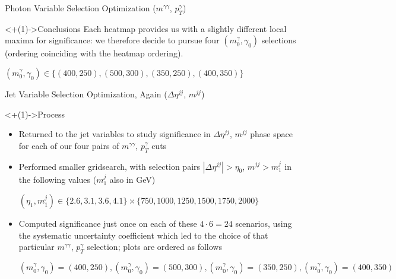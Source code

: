 \documentclass[handout]{beamer}
\begin{document}
\begin{frame}{Photon Variable Selection Optimization ($m^{\gamma \gamma}$, $p_T^{\gamma}$)}
    \smallskip
    
    \begin{block}<+(1)->{Conclusions}
        Each heatmap provides us with a slightly different local maxima for significance: we therefore decide to pursue four $(m^\gamma_0, \gamma_0)$ selections (ordering coinciding with the heatmap ordering).
        \begin{center}
            $(m^\gamma_0, \gamma_0) \in \{(400, 250), (500, 300), (350, 250), (400, 350)\}$
        \end{center}
    \end{block}
\end{frame}

\begin{frame}{Jet Variable Selection Optimization, Again ($\Delta \eta^{jj}$, $m^{jj}$)}
    \begin{block}<+(1)->{Process}
        \begin{itemize}[<+(1)->]
            \item Returned to the jet variables to study significance in $\Delta \eta^{jj}$, $m^{jj}$ phase space for each of our four pairs of $m^{\gamma \gamma}$, $p_T^{\gamma}$ cuts           
            \item Performed smaller gridsearch, with selection pairs $|\Delta \eta^{jj}| > \eta_0$, $m^{jj} > m^j_1$ in the following values ($m^j_1$ also in GeV)
            
            \smallskip
            
            $(\eta_1, m^j_1) \in \{2.6, 3.1, 3.6, 4.1\} \times \{750, 1000, 1250, 1500, 1750, 2000\}$
            \item Computed significance just once on each of these $4 \cdot 6 = 24$ scenarios, using the systematic uncertainty coefficient which led to the choice of that particular $m^{\gamma \gamma}$, $p_T^{\gamma}$ selection; plots are ordered as follows
            
            \smallskip
            
            $(m^\gamma_0, \gamma_0) = (400, 250), (m^\gamma_0, \gamma_0) = (500, 300), (m^\gamma_0, \gamma_0) = (350, 250), (m^\gamma_0, \gamma_0) = (400, 350)$
        \end{itemize}
    \end{block}
    
    \bigskip
    

\end{frame}
\end{document}
